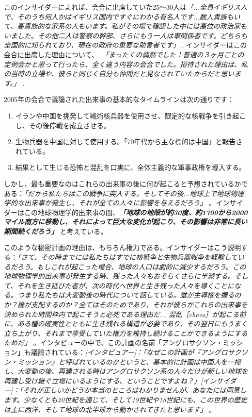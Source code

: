 \documentclass[10pt,twocolumn,letterpaper]{article}
\begin{document}
このインサイダーによれば、会合に出席していた25～30人は\textit{「...全員イギリス人で、そのうち何人かはイギリス国内ですぐにわかる有名人です...数人貴族もいて、高貴族的な家系の人もいます。私がその場で確認した中には高位の政治家もいました。その他二人は警察の幹部、さらにもう一人は軍関係者です。どちらも全国的に知られており、現在の政府の重要な助言者です」} \cite{4}. インサイダーはこの会合に出席した理由について、\ \textit{「まったくの偶然でした！普通の３ヶ月ごとの定例会かと思って行ったら、全く違う内容の会合でした。招待された理由は、私の当時の立場や、彼らと同じく自分も仲間だと見なされていたからだと思います。」} \cite{4}.

2005年の会合で議論された出来事の基本的なタイムラインは次の通りです：
\begin{flushleft}
\begin{enumerate}
    \item イランや中国を挑発して戦術核兵器を使用させ、限定的な核戦争を引き起こし、その後停戦を成立させる。
    \item 生物兵器を中国に対して使用する。「70年代から主な標的は中国」と報告されている。
    \item 結果として生じる恐怖と混乱を口実に、全体主義的な軍事政権を導入する。
\end{enumerate}
\end{flushleft}

しかし、最も重要なのはこれらの出来事の後に何が起こると予想されているかである：\textit{「だから私たちはこの戦争に突入する。そしてその後...地球上で地球物理学的な出来事が発生し、それが全ての人々に影響を与えるだろう」} \cite{4}。インサイダーはこの地球物理学的出来事の間、\textit{\textbf{「地球の地殻が約30度、約1700から2000マイル南方に移動し、それによって巨大な変化が起こり、その影響は非常に長い期間続くだろう」}} \cite{4}と考えている。

このような秘密計画の理由は、もちろん権力である。インサイダーはこう説明する：\textit{「さて、その時までには私たちはすでに核戦争と生物兵器戦争を経験しているだろう。もしこれが起こった場合、地球の人口は劇的に減少するだろう。この地球物理学的出来事が発生する時、残った人々もおそらくさらに半減する。そして、それを生き延びた者が、次の時代へ世界と生き残った人々を導くことになる。つまり私たちは大変動後の時代について話している。誰が主導権を握るのか？誰が支配するのか？全てはそのためであり、それが彼らがこれらの出来事を決められた時間枠内で起こそうと必死である理由だ... 混乱［chaos］が起こる前に、ある種の確実性とともに生き残れる構造が必要であり、その翌日にもうまく立ち上がり、それまで享受していた権力を維持し続けることができるようにするためだ」} \cite{4}。インタビューの中で、この計画の名前「アングロサクソン・ミッション」も議論されている：\textit{[インタビュアー]：「なぜこの計画が『アングロサクソン・ミッション』と呼ばれているのかというと、基本的に計画は中国人を一掃し、大変動の後、再建される時はアングロサクソン系の人々だけが新しい地球を再建し受け継ぐ立場にいるようにする、ということですよね？」[インサイダー]：「それが正しいかどうか本当のところはわかりませんが、あなたには同意します。少なくとも20世紀を通じて、そして19世紀や18世紀にも、この世界の歴史は主に西洋、そして地球の北半球から動かされてきたと思います」} \cite{4}。
\end{document}
